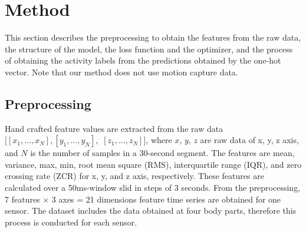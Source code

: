 \documentclass{svmult}
\begin{document}
\section{Method}
\label{sec:method}
This section describes the preprocessing to obtain the features from the raw data, the structure of the model, the loss function and the optimizer, and the process of obtaining the activity labels from the predictions obtained by the one-hot vector. Note that our method does not use motion capture data.



\subsection{Preprocessing}
Hand crafted feature values are extracted from the raw data $[[x_1,\dots, x_N], [y_1, \dots, y_N],$ $[z_1, \dots, z_N]]$, where $x$, $y$, $z$ are raw data of x, y, z axis, and $N$ is the number of samples in a 30-second segment. The features are mean, variance, max, min, root mean square (RMS), interquartile range (IQR), and zero crossing rate (ZCR) for x, y, and z axis, respectively. These features are calculated over a 50ms-window slid in steps of 3 seconds. From the preprocessing, 7 features $\times$ 3 axes = 21 dimensions feature time series are obtained for one sensor. The dataset includes the data obtained at four body parts, therefore this process is conducted for each sensor.
\end{document}
